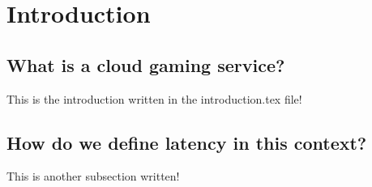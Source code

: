 \section{Introduction}

\subsection{What is a cloud gaming service?}
This is the introduction written in the introduction.tex file!

\subsection{How do we define latency in this context?}
This is another subsection written!